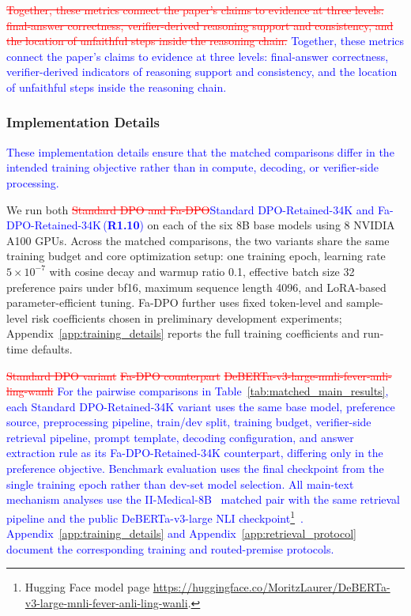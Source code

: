 \documentclass[a4paper,fleqn,doubleblind]{cas-sc}
\DeclareRobustCommand{\deleted}[1]{\textcolor{red}{\sout{#1}}}
\DeclareRobustCommand{\added}[1]{\textcolor{blue}{#1}}
\DeclareRobustCommand{\revtag}[1]{\textcolor{blue}{\scriptsize\,(\textbf{#1})}}
\begin{document}
\deleted{Together, these metrics connect the paper's claims to evidence at three levels: final-answer correctness, verifier-derived reasoning support and consistency, and the location of unfaithful steps inside the reasoning chain.}
\added{Together, these metrics connect the paper's claims to evidence at three levels: final-answer correctness, verifier-derived indicators of reasoning support and consistency, and the location of unfaithful steps inside the reasoning chain.}

\subsubsection{Implementation Details}
\added{These implementation details ensure that the matched comparisons differ in the intended training objective rather than in compute, decoding, or verifier-side processing.}

We run both \deleted{Standard DPO and Fa-DPO}\added{Standard DPO-Retained-34K and Fa-DPO-Retained-34K}\revtag{R1.10} on each of the six 8B base models using 8 NVIDIA A100 GPUs. Across the matched comparisons, the two variants share the same training budget and core optimization setup: one training epoch, learning rate $5\times10^{-7}$ with cosine decay and warmup ratio 0.1, effective batch size 32 preference pairs under bf16, maximum sequence length 4096, and LoRA-based parameter-efficient tuning. Fa-DPO further uses fixed token-level and sample-level risk coefficients chosen in preliminary development experiments; Appendix~\ref{app:training_details} reports the full training coefficients and run-time defaults.

\deleted{Standard DPO variant}
\deleted{Fa-DPO counterpart}
\deleted{DeBERTa-v3-large-mnli-fever-anli-ling-wanli}
\added{For the pairwise comparisons in Table~\ref{tab:matched_main_results}, each Standard DPO-Retained-34K variant uses the same base model, preference source, preprocessing pipeline, train/dev split, training budget, verifier-side retrieval pipeline, prompt template, decoding configuration, and answer extraction rule as its Fa-DPO-Retained-34K counterpart, differing only in the preference objective. Benchmark evaluation uses the final checkpoint from the single training epoch rather than dev-set model selection. All main-text mechanism analyses use the II-Medical-8B~\cite{intelligentinternet2025iimedical8b} matched pair with the same retrieval pipeline and the public DeBERTa-v3-large NLI checkpoint\footnote{Hugging Face model page \url{https://huggingface.co/MoritzLaurer/DeBERTa-v3-large-mnli-fever-anli-ling-wanli}.}~\cite{he2023debertav3,laurer2023less}. Appendix~\ref{app:training_details} and Appendix~\ref{app:retrieval_protocol} document the corresponding training and routed-premise protocols.}
\end{document}
